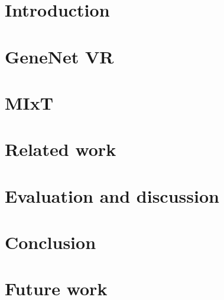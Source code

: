 \documentclass[USenglish]{uit-thesis}
\begin{document}
\tableofcontents

\mainmatter

\chapter{Introduction}


\chapter{GeneNet VR}


\chapter{MIxT}


\chapter{Related work}


\chapter{Evaluation and discussion}


\chapter{Conclusion}


\chapter{Future work}


\printbibliography

% 

\backmatter
\end{document}
